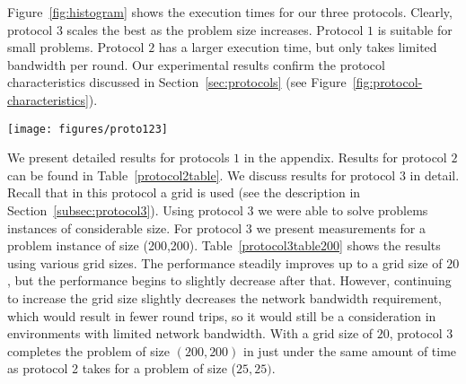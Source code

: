 Figure~\ref{fig:histogram} shows the execution times for our three
protocols. Clearly, protocol $3$ scales the best as
the problem size increases. Protocol $1$ is suitable for small
problems. Protocol $2$ has a larger execution time, but only takes
limited bandwidth per round. Our experimental results confirm the
protocol characteristics discussed in Section~\ref{sec:protocols} (see
Figure~\ref{fig:protocol-characteristics}).

\begin{figure*}
\centering
\texttt{[image: figures/proto123]}

\caption{Timing measurements (in minutes and seconds) comparing protocols 1, 2, and 3.  For problem sizes (100,100) and (200,200), protocol 1 could not compile the circuit.}
\label{fig:histogram}
\end{figure*}

We present detailed results for protocols $1$ in the appendix. Results
for protocol $2$ can be found in Table~\ref{protocol2table}. We
discuss results for protocol $3$ in detail.  Recall that in this
protocol a grid is used (see the description in
Section~\ref{subsec:protocol3}). Using protocol $3$ we were able to
solve problems instances of considerable size. For protocol 3 we
present measurements for a problem instance of size
(200,200). Table~\ref{protocol3table200} shows the results using
various grid sizes. The performance steadily improves up to a grid size
of $20$, but the performance begins to slightly decrease after
that. However, continuing to increase the grid size slightly decreases
the network bandwidth requirement, which would result in fewer round
trips, so it would still be a consideration in environments with limited
network bandwidth. With a grid size of $20$, protocol 3 completes the
problem of size $(200,200)$ in just under the same amount of time as
protocol 2 takes for a problem of size ($25,25)$.

